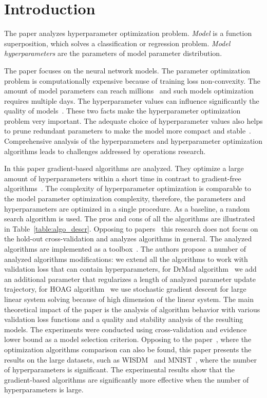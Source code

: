 \documentclass[smallcondensed]{svjour3}
\begin{document}
\section{Introduction}
\label{intro}
The paper analyzes hyperparameter optimization problem. \textit{Model} is a function superposition, which solves a classification or regression problem. \textit{Model hyperparameters} are the parameters of model parameter distribution.

The paper focuses on the neural network models. The parameter optimization problem is computationally expensive because of training loss non-convexity. The amount of model parameters can reach millions~\cite{hinton_rbm}  and such models optimization requires multiple days\cite{suts}.   The hyperparameter values can influence significantly the quality of models~\cite{journal1,journal2}. These two facts make the hyperparameter optimization problem very important. The adequate choice of hyperparameter values also helps to prune redundant parameters to make the model more compact and stable~\cite{nips,ard}. Comprehensive analysis of the hyperparameters and hyperparameter optimization algorithms leads to challenges addressed by operations research.

In this paper gradient-based algorithms are analyzed. They optimize a large amount of hyperparameters within a short time in contrast to gradient-free algorithms~\cite{hyper}.  The complexity of hyperparameter optimization is comparable to the model parameter optimization complexity, therefore, the parameters and hyperparameters are  optimized in a single procedure. As a baseline, a random search algorithm is used. The pros and cons of all the algorithms  
are illustrated in Table~\ref{table:algo_descr}. Opposing to papers~\cite{hyper_mad,hyper_hoag,hyper_greed} this research does not focus on the hold-out cross-validation and analyzes algorithms in general. The analyzed algorithms are implemented as a toolbox~\cite{pyfos}. The authors propose a number of analyzed algorithms modifications: we extend all the algorithms to work with validation loss that can contain hyperparameters, for DrMad algorithm~\cite{hyper_mad} we add an additional parameter that regularizes a length of analyzed parameter update trajectory, for HOAG algorithm~\cite{hyper_hoag} we use stochastic gradient descent for large linear system solving because of high dimension of the linear system.   The main theoretical impact of the paper is the analysis of algorithm behavior with various validation loss functions and a quality and stability analysis of the resulting models. The experiments were conducted using cross-validation and evidence lower bound as a model selection criterion. Opposing to the paper~\cite{hyper_hoag}, where  the optimization algorithms comparison can also be found, this paper presents the results on the large datasets, such as  WISDM~\cite{wisdm} and MNIST~\cite{mnist}, where the number of hyperparameters is significant. 
The experimental results show that the gradient-based algorithms are significantly more effective when the number of hyperparameters is large. 
\end{document}
